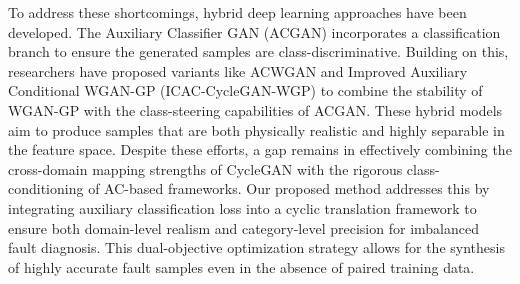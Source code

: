 To address these shortcomings, hybrid deep learning approaches have been developed. The Auxiliary Classifier GAN (ACGAN) \cite{5} incorporates a classification branch to ensure the generated samples are class-discriminative. Building on this, researchers have proposed variants like ACWGAN \cite{35} and Improved Auxiliary Conditional WGAN-GP (ICAC-CycleGAN-WGP) \cite{26} to combine the stability of WGAN-GP with the class-steering capabilities of ACGAN. These hybrid models aim to produce samples that are both physically realistic and highly separable in the feature space. Despite these efforts, a gap remains in effectively combining the cross-domain mapping strengths of CycleGAN with the rigorous class-conditioning of AC-based frameworks. Our proposed method addresses this by integrating auxiliary classification loss into a cyclic translation framework to ensure both domain-level realism and category-level precision for imbalanced fault diagnosis. This dual-objective optimization strategy allows for the synthesis of highly accurate fault samples even in the absence of paired training data.

